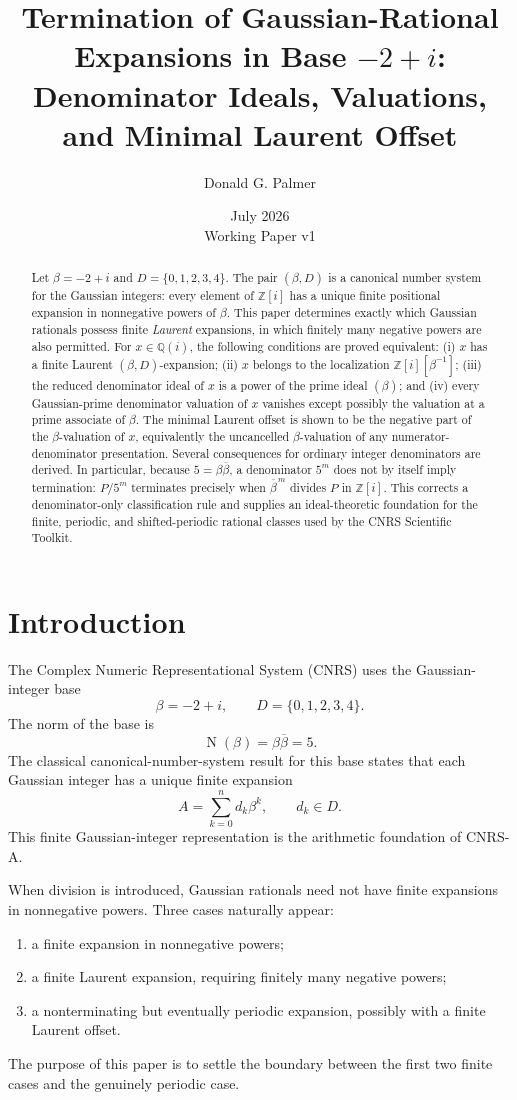 \documentclass[11pt]{article}
\title{Termination of Gaussian-Rational Expansions in Base $-2+i$:\\
Denominator Ideals, Valuations, and Minimal Laurent Offset}
\author{Donald G. Palmer}
\date{July 2026\\Working Paper v1}
\theoremstyle{definition}
\newcommand{\Norm}{\operatorname{N}}
\begin{document}
\maketitle

\begin{abstract}
Let $\beta=-2+i$ and $D=\{0,1,2,3,4\}$.  The pair $(\beta,D)$ is a canonical number system for the Gaussian integers: every element of $\mathbb Z[i]$ has a unique finite positional expansion in nonnegative powers of $\beta$.  This paper determines exactly which Gaussian rationals possess finite \emph{Laurent} expansions, in which finitely many negative powers are also permitted.  For $x\in\mathbb Q(i)$, the following conditions are proved equivalent: (i) $x$ has a finite Laurent $(\beta,D)$-expansion; (ii) $x$ belongs to the localization $\mathbb Z[i][\beta^{-1}]$; (iii) the reduced denominator ideal of $x$ is a power of the prime ideal $(\beta)$; and (iv) every Gaussian-prime denominator valuation of $x$ vanishes except possibly the valuation at a prime associate of $\beta$.  The minimal Laurent offset is shown to be the negative part of the $\beta$-valuation of $x$, equivalently the uncancelled $\beta$-valuation of any numerator-denominator presentation.  Several consequences for ordinary integer denominators are derived.  In particular, because $5=\beta\overline\beta$, a denominator $5^m$ does not by itself imply termination: $P/5^m$ terminates precisely when $\overline\beta^{\,m}$ divides $P$ in $\mathbb Z[i]$.  This corrects a denominator-only classification rule and supplies an ideal-theoretic foundation for the finite, periodic, and shifted-periodic rational classes used by the CNRS Scientific Toolkit.
\end{abstract}

\section{Introduction}

The Complex Numeric Representational System (CNRS) uses the Gaussian-integer base
\[
\beta=-2+i,
\qquad
D=\{0,1,2,3,4\}.
\]
The norm of the base is
\[
\Norm(\beta)=\beta\overline\beta=5.
\]
The classical canonical-number-system result for this base states that each Gaussian integer has a unique finite expansion
\[
A=\sum_{k=0}^{n}d_k\beta^k,
\qquad d_k\in D.
\]
This finite Gaussian-integer representation is the arithmetic foundation of CNRS-A.

When division is introduced, Gaussian rationals need not have finite expansions in nonnegative powers.  Three cases naturally appear:
\begin{enumerate}[label=(\roman*)]
\item a finite expansion in nonnegative powers;
\item a finite Laurent expansion, requiring finitely many negative powers;
\item a nonterminating but eventually periodic expansion, possibly with a finite Laurent offset.
\end{enumerate}
The purpose of this paper is to settle the boundary between the first two finite cases and the genuinely periodic case.
\end{document}
